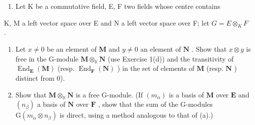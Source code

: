 \begin{enumerate}
\def\labelenumi{\arabic{enumi}.}
\setcounter{enumi}{1}
\tightlist
\item
  Let K be a commutative field, E, F two fields whose centre contains
\end{enumerate}

K, M a left vector space over E and N a left vector space over F; let \(G = E \otimes_{K} F\) .

\begin{enumerate}
\def\labelenumi{(\alph{enumi})}
\item
  Let \(x \neq 0\) be an element of \(\mathbf{M}\) and \(y \neq 0\) an element of \(\mathbf{N}\) . Show that \(x \otimes y\) is free in the G-module \(\mathbf{M} \otimes_{\mathbb{K}} \mathbf{N}\) (use Exercise 1(d)) and the transitivity of \(\operatorname{End}_{\mathbf{E}}(\mathbf{M})\) (resp. \(\operatorname{End}_{\mathbf{F}}(\mathbf{N})\) ) in the set of elements of \(\mathbf{M}\) (resp. \(\mathbf{N}\) ) distinct from 0).
\item
  Show that \(\mathbf{M} \otimes_{\mathbb{K}} \mathbf{N}\) is a free G-module. (If \((m_{\alpha})\) is a basis of \(\mathbf{M}\) over \(\mathbf{E}\) and \((n_{\beta})\) a basis of \(\mathbf{N}\) over \(\mathbf{F}\) , show that the sum of the G-modules \(\mathrm{G}(m_{\alpha} \otimes n_{\beta})\) is direct, using a method analogous to that of (a).)
\end{enumerate}

